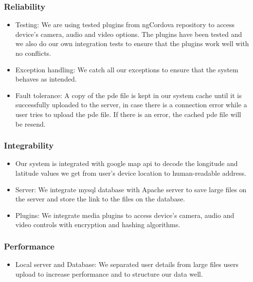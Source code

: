 \documentclass[a4paper,12pt]{article}
\begin{document}
\subsubsection{Reliability}
	\begin{itemize}
		\item Testing: We are using tested plugins from ngCordova repository to access device's camera, audio and video options. The plugins have been tested and we also do our own integration tests to ensure that the plugins work well with no conflicts.
		\item Exception handling: We catch all our exceptions to ensure that the system behaves as intended.
		\item Fault tolerance: A copy of the pde file is kept in our system cache until it is successfully uploaded to the server, in case there is a connection error while a user tries to upload the pde file. If there is an error, the cached pde file will be resend.  
	\end{itemize}
\subsubsection{Integrability}
	\begin{itemize}
		\item Our system is integrated with google map api to decode the longitude and latitude values we get from user's device location to human-readable address.
		\item Server: We integrate mysql database with Apache server to save large files on the server and store the link to the files on the database.
		\item Plugins: We integrate media plugins to access device's camera, audio and video controls with encryption and hashing algorithms. 
	\end{itemize}
\subsubsection{Performance}
	\begin{itemize}
		\item Local server and Database: We separated user details from large files users upload to increase performance and to structure our data well.
	\end{itemize}
\end{document}
